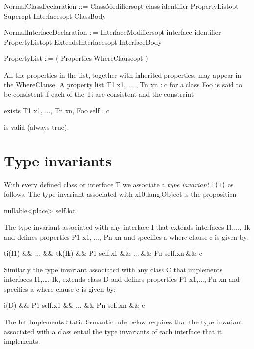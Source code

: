 \begin{x10}
NormalClassDeclaration ::= 
    ClassModifiersopt class identifier 
    PropertyListopt Superopt Interfacesopt ClassBody

NormalInterfaceDeclaration ::= 
   InterfaceModifiersopt interface identifier 
   PropertyListopt ExtendsInterfacesopt InterfaceBody

PropertyList     ::= ( Properties WhereClauseopt )
\end{x10}

All the properties in the list, together with inherited properties,
may appear in the {\cf WhereClause}. A property list {\cf T1 x1, ...., Tn xn : c}
for a class {\cf Foo} is said to be consistent if each of the {\cf Ti} are
consistent and the constraint
\begin{x10}
      exists  T1 x1, ..., Tn xn, Foo self . c
\end{x10}
\noindent is valid (always true).

\section{Type invariants}\label{DepType:TypeInvariant}

With every defined class or interface {\cf T} we associate a {\em type
invariant} {\tt i(T)} as follows. The type invariant associated with
{\cf x10.lang.Object} is the proposition

\begin{x10}
nullable<place> self.loc  
\end{x10}

The type invariant associated with any interface {\cf I} that extends
interfaces {\cf I1,..., Ik} and defines properties {\cf P1 x1, ..., Pn xn} and
specifies a where clause {\cf c} is given by:

\begin{x10}
  ti(I1) \&\& ... \&\& tk(Ik) \&\& P1 self.x1 
  \&\& ... \&\& Pn self.xn \&\& c  
\end{x10}

Similarly the type invariant associated with any class {\cf C} that
implements interfaces {\cf I1,..., Ik}, extends class {\cf D} and defines
properties {\cf P1 x1,..., Pn xn} and specifies a where clause {\cf c} is given
by:
\begin{x10}
  i(D) \&\& P1 self.x1 \&\& ... \&\& Pn self.xn \&\& c  
\end{x10}

The {\sc Int Implements} Static Semantic rule below requires that the
type invariant associated with a class entail the type invariants of
each interface that it implements.

